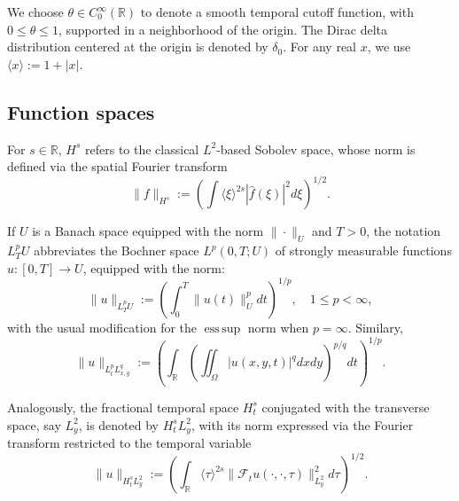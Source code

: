 \documentclass[11pt]{article}
\numberwithin{equation}{section}
\begin{document}
We choose $\theta \in C_0^\infty(\mathbb{R})$ to denote a smooth temporal cutoff function, with $0 \le \theta \le 1$, supported in a neighborhood of the origin. The Dirac delta distribution centered at the origin is denoted by $\delta_0$. For any real $x$, we use $\langle x \rangle := 1 + |x|$.

\subsection{Function spaces}

For $s \in \mathbb{R}$, $H^s$ refers to the classical $L^2$-based Sobolev space, whose norm is defined via the spatial Fourier transform
$$\|f\|_{H^s} := \left( \int \langle \xi \rangle^{2s} |\widehat{f}(\xi)|^2 d\xi \right)^{1/2}.$$

If $U$ is a Banach space equipped with the norm $\|\cdot\|_{U}$ and $T>0$, the notation $L^p_T U$ abbreviates the Bochner space $L^p(0,T; U)$ of strongly measurable functions $u: [0,T] \to U$, equipped with the norm:
$$\|u\|_{L^p_T U} := \left( \int_0^T \|u(t)\|_{U}^p dt \right)^{1/p}, \quad 1 \leq p < \infty,$$
with the usual modification for the $\operatorname{ess\, sup}$ norm when $p=\infty$. Similary,
$$\|u\|_{L^p_t L^q_{x,y}} := \left( \int_{\mathbb{R}} \left( \iint_{\Omega} |u(x,y,t)|^q dx dy \right)^{p/q} dt \right)^{1/p}.$$

Analogously, the fractional temporal space $H^{s}_{t}$ conjugated with the transverse space, say $L^{2}_{y}$, is denoted by $H^{s}_{t} L^{2}_{y}$, with its norm expressed via the Fourier transform restricted to the temporal variable
$$\|u\|_{H^s_t L^2_y} := \left( \int_{\mathbb{R}} \langle \tau \rangle^{2s} \|\mathcal{F}_t u(\cdot,\cdot,\tau)\|_{L^2_y}^2 d\tau \right)^{1/2}.$$
\end{document}
